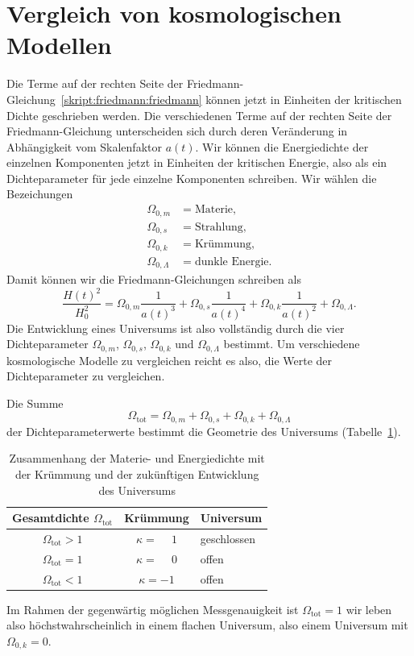 \section{Vergleich von kosmologischen Modellen}
Die Terme auf der rechten Seite der
Friedmann-Gleichung~\eqref{skript:friedmann:friedmann}
können jetzt in Einheiten der kritischen Dichte geschrieben werden.
Die verschiedenen Terme auf der rechten Seite der Friedmann-Gleichung
unterscheiden sich durch deren Veränderung in Abhängigkeit vom
Skalenfaktor $a(t)$.
Wir können die Energiedichte der einzelnen Komponenten jetzt in
Einheiten der kritischen Energie, also als ein Dichteparameter
für jede einzelne Komponenten schreiben.
Wir wählen die Bezeichungen
\begin{align*}
\Omega_{0,m}&=\text{Materie},\\
\Omega_{0,s}&=\text{Strahlung},\\
\Omega_{0,k}&=\text{Krümmung},\\
\Omega_{0,\Lambda}&=\text{dunkle Energie}.
\end{align*}
Damit können wir die Friedmann-Gleichungen schreiben als
\begin{equation}
\frac{H(t)^2}{H_0^2}
=
\Omega_{0,m}\frac1{a(t)^3}
+
\Omega_{0,s}\frac1{a(t)^4}
+
\Omega_{0,k}\frac1{a(t)^2}
+
\Omega_{0,\Lambda}.
\label{skript:friedmann:omegagleichung}
\end{equation}
Die Entwicklung eines Universums ist also vollständig durch die
vier Dichteparameter 
$\Omega_{0,m}$,
$\Omega_{0,s}$,
$\Omega_{0,k}$ und
$\Omega_{0,\Lambda}$
bestimmt.
Um verschiedene kosmologische Modelle zu vergleichen reicht es also,
die Werte der Dichteparameter zu vergleichen.

Die Summe
\[
\Omega_{\text{tot}}
=
\Omega_{0,m}
+
\Omega_{0,s}
+
\Omega_{0,k}
+
\Omega_{0,\Lambda}
\]
der Dichteparameterwerte bestimmt die Geometrie des Universums
(Tabelle~\ref{skript:friedmann:tabelle}).
\begin{table}
\centering
\begin{tabular}{|c|c|l|}
\hline
Gesamtdichte $\Omega_{\text{tot}}$&Krümmung&Universum\\
\hline
$\Omega_{\text{tot}}>1$&$\kappa = \phantom{-}1$&geschlossen\\
$\Omega_{\text{tot}}=1$&$\kappa = \phantom{-}0$&offen\\
$\Omega_{\text{tot}}<1$&$\kappa =-1$&offen\\
\hline
\end{tabular}
\caption{Zusammenhang der Materie- und Energiedichte mit der Krümmung
und der zukünftigen Entwicklung des Universums
\label{skript:friedmann:tabelle}}
\end{table}
Im Rahmen der gegenwärtig möglichen Messgenauigkeit ist
$\Omega_{\text{tot}}=1$ wir leben also höchstwahrscheinlich in
einem flachen Universum, also einem Universum mit $\Omega_{0,k}=0$.

